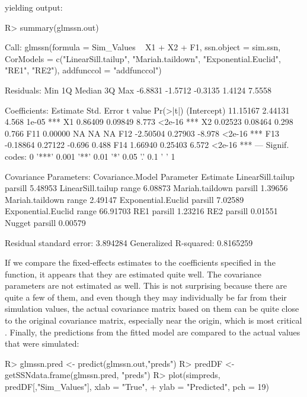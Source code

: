 \documentclass[nojss]{jss}
\renewenvironment{Schunk}{\vspace{\topsep}}{\vspace{\topsep}}
\begin{document}
yielding output:
\begin{Schunk}
\begin{Sinput}
R> summary(glmssn.out)
\end{Sinput}
\begin{Soutput}
Call:
glmssn(formula = Sim_Values ~ X1 + X2 + F1, ssn.object = sim.ssn, 
    CorModels = c("LinearSill.tailup", "Mariah.taildown", "Exponential.Euclid", 
        "RE1", "RE2"), addfunccol = "addfunccol")

Residuals:
    Min      1Q  Median      3Q     Max 
-6.8831 -1.5712 -0.3135  1.4124  7.5558 

Coefficients:
            Estimate Std. Error t value Pr(>|t|)    
(Intercept) 11.15167    2.44131   4.568    1e-05 ***
X1           0.86409    0.09849   8.773   <2e-16 ***
X2           0.02523    0.08464   0.298    0.766    
F11          0.00000         NA      NA       NA    
F12         -2.50504    0.27903  -8.978   <2e-16 ***
F13         -0.18864    0.27122  -0.696    0.488    
F14          1.66940    0.25403   6.572   <2e-16 ***
---
Signif. codes:  0 '***' 0.001 '**' 0.01 '*' 0.05 '.' 0.1 ' ' 1

Covariance Parameters:
   Covariance.Model Parameter Estimate
  LinearSill.tailup   parsill  5.48953
  LinearSill.tailup     range  6.08873
    Mariah.taildown   parsill  1.39656
    Mariah.taildown     range  2.49147
 Exponential.Euclid   parsill  7.02589
 Exponential.Euclid     range 66.91703
                RE1   parsill  1.23216
                RE2   parsill  0.01551
             Nugget   parsill  0.00579

Residual standard error: 3.894284
Generalized R-squared: 0.8165259
\end{Soutput}
\end{Schunk}

If we compare the fixed-effects estimates to the coefficients
specified in the  function, it appears that they
are estimated quite well. The covariance parameters are not estimated
as well. This is not surprising because there are quite a few of them,
and even though they may individually be far from their simulation
values, the actual covariance matrix based on them can be quite close
to the original covariance matrix, especially near the origin, which
is most critical \citep{Stei:asym:1988}.  Finally, the predictions
from the fitted model are compared to the actual values that were
simulated:
\begin{Schunk}
\begin{Sinput}
R> glmssn.pred <- predict(glmssn.out,"preds")
R> predDF <- getSSNdata.frame(glmssn.pred, "preds")
R> plot(simpreds, predDF[,"Sim_Values"], xlab = "True",
+     ylab = "Predicted", pch = 19)
\end{Sinput}
\end{Schunk}
\end{document}
